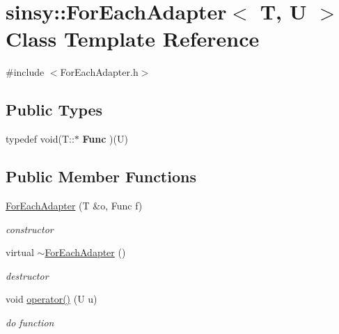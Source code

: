 \hypertarget{classsinsy_1_1ForEachAdapter}{\section{sinsy\-:\-:\-For\-Each\-Adapter$<$ \-T, \-U $>$ \-Class \-Template \-Reference}
\label{classsinsy_1_1ForEachAdapter}
}


{\ttfamily \#include $<$\-For\-Each\-Adapter.\-h$>$}

\subsection*{\-Public \-Types}
\begin{DoxyCompactItemize}
\item 
\hypertarget{classsinsy_1_1ForEachAdapter_ad0016aeaa71d6d5f201262e5b50b6e06}{typedef void(\-T\-::$\ast$ {\bfseries \-Func} )(\-U)}\label{classsinsy_1_1ForEachAdapter_ad0016aeaa71d6d5f201262e5b50b6e06}

\end{DoxyCompactItemize}
\subsection*{\-Public \-Member \-Functions}
\begin{DoxyCompactItemize}
\item 
\hypertarget{classsinsy_1_1ForEachAdapter_a5c6be71ea4ccfdc726ba9f9cc4f59cea}{\hyperlink{classsinsy_1_1ForEachAdapter_a5c6be71ea4ccfdc726ba9f9cc4f59cea}{\-For\-Each\-Adapter} (\-T \&o, \-Func f)}\label{classsinsy_1_1ForEachAdapter_a5c6be71ea4ccfdc726ba9f9cc4f59cea}

\begin{DoxyCompactList}\small\item\em constructor \end{DoxyCompactList}\item 
\hypertarget{classsinsy_1_1ForEachAdapter_ab01b873b14c5700101b984beb7e6017d}{virtual \hyperlink{classsinsy_1_1ForEachAdapter_ab01b873b14c5700101b984beb7e6017d}{$\sim$\-For\-Each\-Adapter} ()}\label{classsinsy_1_1ForEachAdapter_ab01b873b14c5700101b984beb7e6017d}

\begin{DoxyCompactList}\small\item\em destructor \end{DoxyCompactList}\item 
\hypertarget{classsinsy_1_1ForEachAdapter_ac2bbdd944f14ffab57c379a527c3386a}{void \hyperlink{classsinsy_1_1ForEachAdapter_ac2bbdd944f14ffab57c379a527c3386a}{operator()} (\-U u)}\label{classsinsy_1_1ForEachAdapter_ac2bbdd944f14ffab57c379a527c3386a}

\begin{DoxyCompactList}\small\item\em do function \end{DoxyCompactList}\end{DoxyCompactItemize}


